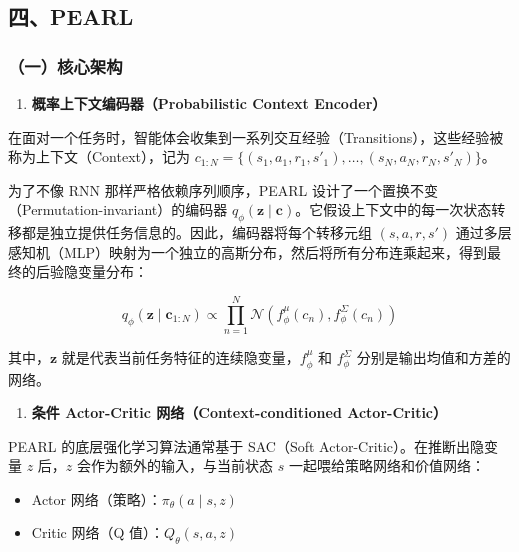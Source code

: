 \hypertarget{ux56dbpearl}{%
\subsection{四、PEARL}\label{ux56dbpearl}}

\hypertarget{ux4e00ux6838ux5fc3ux67b6ux6784}{%
\subsubsection{（一）核心架构}\label{ux4e00ux6838ux5fc3ux67b6ux6784}}

\begin{enumerate}
\def\labelenumi{\arabic{enumi}.}
\tightlist
\item
  \textbf{概率上下文编码器（Probabilistic Context Encoder）}
\end{enumerate}

在面对一个任务时，智能体会收集到一系列交互经验（Transitions），这些经验被称为上下文（Context），记为 \(c_{1:N}=\{(s_1,a_1,r_1,s'_1),\ldots,(s_N,a_N,r_N,s'_N)\}\)。

为了不像 RNN 那样严格依赖序列顺序，PEARL 设计了一个置换不变（Permutation-invariant）的编码器 \(q_{\phi}(\mathbf{z}\mid\mathbf{c})\)。它假设上下文中的每一次状态转移都是独立提供任务信息的。因此，编码器将每个转移元组 \((s,a,r,s')\) 通过多层感知机（MLP）映射为一个独立的高斯分布，然后将所有分布连乘起来，得到最终的后验隐变量分布：

\[
q_{\phi}(\mathbf{z}\mid\mathbf{c}_{1:N})
\propto
\prod_{n=1}^{N}
\mathcal{N}\left(f_{\phi}^{\mu}(c_n), f_{\phi}^{\Sigma}(c_n)\right)
\]

其中，\(\mathbf{z}\) 就是代表当前任务特征的连续隐变量，\(f_{\phi}^{\mu}\) 和 \(f_{\phi}^{\Sigma}\) 分别是输出均值和方差的网络。

\begin{enumerate}
\def\labelenumi{\arabic{enumi}.}
\setcounter{enumi}{1}
\tightlist
\item
  \textbf{条件 Actor-Critic 网络（Context-conditioned Actor-Critic）}
\end{enumerate}

PEARL 的底层强化学习算法通常基于 SAC（Soft Actor-Critic）。在推断出隐变量 \(z\) 后，\(z\) 会作为额外的输入，与当前状态 \(s\) 一起喂给策略网络和价值网络：

\begin{itemize}
\tightlist
\item
  Actor 网络（策略）：\(\pi_{\theta}(a\mid s,z)\)
\item
  Critic 网络（Q 值）：\(Q_{\theta}(s,a,z)\)
\end{itemize}

